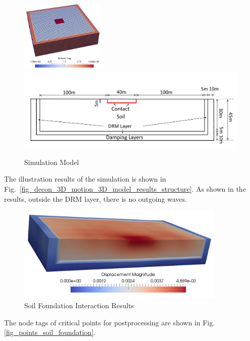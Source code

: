 \begin{figure}[H]
  \centering
  \includegraphics[width = 4cm]{./Figure-files/nonlinear_analysis_steps/soil-foundation/soil_foundation.png}
  \includegraphics[width = 12cm]{./Figure-files/nonlinear_analysis_steps/soil-foundation/soil_foundation.pdf}
  \caption{Simulation Model}
  \label{fig_foundation_only}
\end{figure}


The illustration results of the simulation is shown in Fig.~\ref{fig_decon_3D_motion_3D_model_results_structure}.
As shown in the results, outside the DRM layer, there is no outgoing waves. 

\begin{figure}[H]
  \centering
  \includegraphics[width = 10cm]{./Figure-files/nonlinear_analysis_steps/soil-foundation/foundation_results.png}
  \caption{Soil Foundation Interaction Results}
  \label{fig_soil_foundation_motion_3D_model_results_structure}
\end{figure}



The node tags of critical points for postprocessing are shown in Fig.\ref{fig_points_soil_foundation}.

